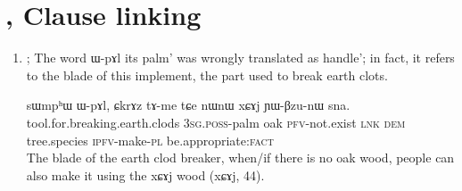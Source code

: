 \documentclass[oldfontcommands,oneside,a4paper,11pt]{article}
\newcommand{\ipa}[1]{{\phon \mbox{#1}}} %
\begin{document}
\section{\citet{jacques14linking}, Clause linking}
\begin{enumerate}


\item \citet[284, ex. 33]{jacques14linking}; The word \ipa{ɯ-pɤl}  its palm' was wrongly translated as  handle'; in fact, it refers to the blade of this implement, the part used to break earth clots.


\begin{exe}
\ex \label{ex:CkrAz.tAme}
\gll 
   	\ipa{sɯmpʰɯ}  	\ipa{ɯ-pɤl,}  	\ipa{ɕkrɤz}  	\ipa{tɤ-me}  	\ipa{tɕe}  	\ipa{nɯnɯ}  	\ipa{xɕɤj}  	\ipa{ɲɯ-βzu-nɯ}  	\ipa{sna.}  \\
   	tool.for.breaking.earth.clods \textsc{3sg.poss}-palm oak \textsc{pfv}-not.exist \textsc{lnk} \textsc{dem} tree.species \textsc{ipfv}-make-\textsc{pl} be.appropriate:\textsc{fact} \\
\glt The blade of the earth clod breaker, when/if there is no oak wood, people can also make it using the \ipa{xɕɤj} wood (\ipa{xɕɤj}, 44).
\end{exe}
\end{enumerate}




\end{document}
